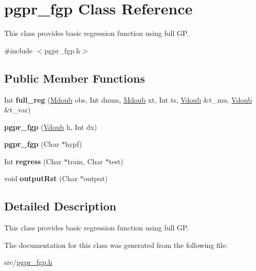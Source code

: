 \hypertarget{classpgpr__fgp}{\section{pgpr\-\_\-fgp Class Reference}
\label{classpgpr__fgp}
}


This class provides basic regression function using full G\-P.  




{\ttfamily \#include $<$pgpr\-\_\-fgp.\-h$>$}

\subsection*{Public Member Functions}
\begin{DoxyCompactItemize}
\item 
\hypertarget{classpgpr__fgp_abafaa50876ec959782f9eb24873ad472}{Int {\bfseries full\-\_\-reg} (\hyperlink{classpgpr__matrix}{Mdoub} obs, Int dnum, \hyperlink{classpgpr__matrix}{Mdoub} xt, Int ts, \hyperlink{classpgpr__vector}{Vdoub} \&t\-\_\-mu, \hyperlink{classpgpr__vector}{Vdoub} \&t\-\_\-var)}\label{classpgpr__fgp_abafaa50876ec959782f9eb24873ad472}

\item 
\hypertarget{classpgpr__fgp_aef1ddc0350fb260e0deb163d361445d9}{{\bfseries pgpr\-\_\-fgp} (\hyperlink{classpgpr__vector}{Vdoub} h, Int dx)}\label{classpgpr__fgp_aef1ddc0350fb260e0deb163d361445d9}

\item 
\hypertarget{classpgpr__fgp_a43db9cc3e874faa3de98db6e47861e9b}{{\bfseries pgpr\-\_\-fgp} (Char $\ast$hypf)}\label{classpgpr__fgp_a43db9cc3e874faa3de98db6e47861e9b}

\item 
\hypertarget{classpgpr__fgp_aaaac0743b16a448d2466be1d483554e1}{Int {\bfseries regress} (Char $\ast$train, Char $\ast$test)}\label{classpgpr__fgp_aaaac0743b16a448d2466be1d483554e1}

\item 
\hypertarget{classpgpr__fgp_a34744aec38cc720e458ee8f5de002c0a}{void {\bfseries output\-Rst} (Char $\ast$output)}\label{classpgpr__fgp_a34744aec38cc720e458ee8f5de002c0a}

\end{DoxyCompactItemize}


\subsection{Detailed Description}
This class provides basic regression function using full G\-P. 

The documentation for this class was generated from the following file\-:\begin{DoxyCompactItemize}
\item 
src/\hyperlink{pgpr__fgp_8h}{pgpr\-\_\-fgp.\-h}\end{DoxyCompactItemize}
